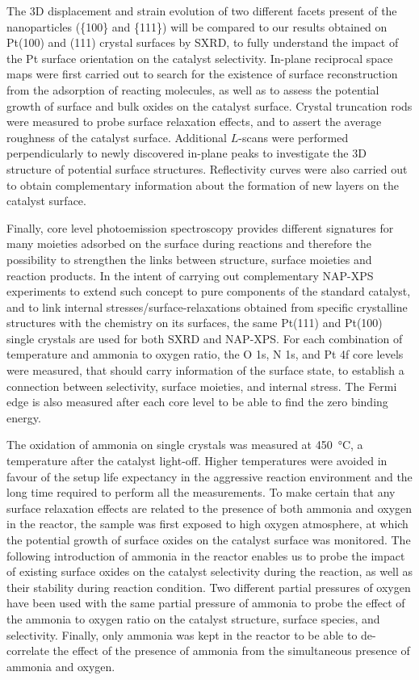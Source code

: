 The 3D displacement and strain evolution of two different facets present of the nanoparticles (\{100\} and \{111\}) will be compared to our results obtained on Pt(100) and (111) crystal surfaces by SXRD, to fully understand the impact of the Pt surface orientation on the catalyst selectivity.
In-plane reciprocal space maps were first carried out to search for the existence of surface reconstruction from the adsorption of reacting molecules, as well as to assess the potential growth of surface and bulk oxides on the catalyst surface.
Crystal truncation rods were measured to probe surface relaxation effects, and to assert the average roughness of the catalyst surface.
Additional $L$-scans were performed perpendicularly to newly discovered in-plane peaks to investigate the 3D structure of potential surface structures.
Reflectivity curves were also carried out to obtain complementary information about the formation of new layers on the catalyst surface.

Finally, core level photoemission spectroscopy provides different signatures for many moieties adsorbed on the surface during reactions and therefore the possibility to strengthen the links between structure, surface moieties and reaction products.
In the intent of carrying out complementary NAP-XPS experiments to extend such concept to pure components of the standard catalyst, and to link internal stresses/surface-relaxations obtained from specific crystalline structures with the chemistry on its surfaces, the same Pt(111) and Pt(100) single crystals are used for both SXRD and NAP-XPS.
For each combination of temperature and ammonia to oxygen ratio, the O 1s, N 1s, and Pt 4f core levels were measured, that should carry information of the surface state, to establish a connection between selectivity, surface moieties, and internal stress.
The Fermi edge is also measured after each core level to be able to find the zero binding energy.

The oxidation of ammonia on single crystals was measured at \qty{450}{\degreeCelsius}, a temperature after the catalyst light-off.
Higher temperatures were avoided in favour of the setup life expectancy in the aggressive reaction environment and the long time required to perform all the measurements.
To make certain that any surface relaxation effects are related to the presence of both ammonia and oxygen in the reactor, the sample was first exposed to high oxygen atmosphere, at which the potential growth of surface oxides on the catalyst surface was monitored.
The following introduction of ammonia in the reactor enables us to probe the impact of existing surface oxides on the catalyst selectivity during the reaction, as well as their stability during reaction condition.
Two different partial pressures of oxygen have been used with the same partial pressure of ammonia to probe the effect of the ammonia to oxygen ratio on the catalyst structure, surface species, and selectivity.
Finally, only ammonia was kept in the reactor to be able to de-correlate the effect of the presence of ammonia from the simultaneous presence of ammonia and oxygen.

